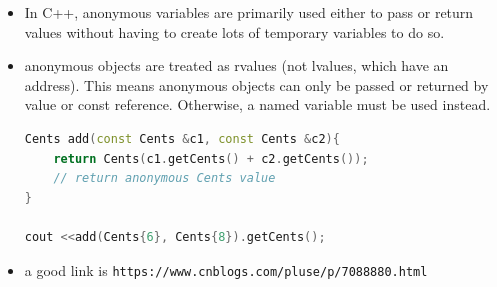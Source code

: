 \documentclass[a4paper,12pt,twoside]{book}
\begin{document}
\begin{itemize}
\item In C++, anonymous variables are primarily used either to pass or return values without having to create lots of temporary variables to do so.
		
\item anonymous objects are treated as rvalues (not lvalues, which have an address). This means anonymous objects can only be passed or returned by value or const reference. Otherwise, a named variable must be used instead.
		
\begin{lstlisting}[frame=single, language=c++]
Cents add(const Cents &c1, const Cents &c2){
	return Cents(c1.getCents() + c2.getCents());
	// return anonymous Cents value
}
		
cout <<add(Cents{6}, Cents{8}).getCents();
\end{lstlisting}

\item a good link is \verb|https://www.cnblogs.com/pluse/p/7088880.html|
	
\end{itemize}
\end{document}
